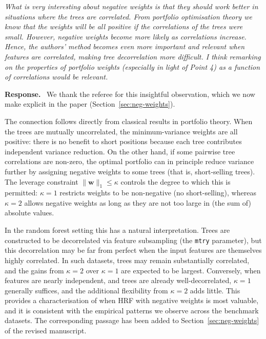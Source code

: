 \documentclass[12pt]{article}
\newcommand{\comment}[1]{\begin{refbox}\textit{#1}\end{refbox}}
\newcommand{\response}{\medskip\noindent\textbf{Response.}\ }
\begin{document}
\comment{What is very interesting about negative weights is that they should
work better in situations where the trees are correlated.  From portfolio
optimisation theory we know that the weights will be all positive if the
correlations of the trees were small.  However, negative weights become more
likely as correlations increase.  Hence, the authors' method becomes even
more important and relevant when features are correlated, making tree
decorrelation more difficult.  I think remarking on the properties of
portfolio weights (especially in light of Point 4) as a function of
correlations would be relevant.}

\response
We thank the referee for this insightful observation, which we now make
explicit in the paper (Section~\ref*{sec:neg-weights}).

The connection follows directly from classical results in portfolio theory.
When the trees are mutually uncorrelated, the minimum-variance weights are
all positive: there is no benefit to short positions because each tree
contributes independent variance reduction. On the other hand,
if some pairwise tree correlations are non-zero,
the optimal portfolio can in principle reduce variance further by assigning negative weights to some trees (that is, short-selling trees). 
The leverage constraint $\|\mathbf{w}\|_1 \leq \kappa$ controls the degree
to which this is permitted: $\kappa = 1$ restricts weights to be non-negative
(no short-selling), whereas $\kappa = 2$ allows negative weights as long as they are not too large in (the sum of) absolute values. 

In the random forest setting this has a natural interpretation.
Trees are constructed to be decorrelated via feature subsampling
(the \texttt{mtry} parameter), but this decorrelation may be far from perfect when
the input features are themselves highly correlated.
In such datasets, trees may remain substantially correlated, and the gains
from $\kappa = 2$ over $\kappa = 1$ are expected to be largest.
Conversely, when features are nearly independent, and trees are already
well-decorrelated, $\kappa = 1$ generally suffices, and the additional flexibility from
$\kappa = 2$ adds little.
This provides a characterisation of when HRF with negative weights is most
valuable, and it is consistent with the empirical patterns we observe across
the benchmark datasets.
The corresponding passage has been added to Section~\ref*{sec:neg-weights}
of the revised manuscript.

\end{document}
